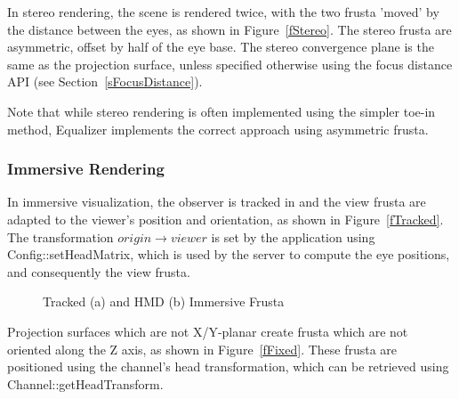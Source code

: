 \documentclass[10pt,a4]{scrartcl}
\newcommand{\fig}[1]{Figure~\ref{#1}}
\newcommand{\sref}[1]{Section~\ref{#1}}
\begin{document}
In stereo rendering, the scene is rendered twice, with the two frusta
'moved' by the distance between the eyes, as shown in \fig{fStereo}. The stereo
frusta are asymmetric, offset by half of the eye base. The stereo convergence
plane is the same as the projection surface, unless specified otherwise using
the focus distance API (see \sref{sFocusDistance}).

Note that while stereo rendering is often implemented using the simpler toe-in
method, Equalizer implements the correct approach using asymmetric frusta.

\subsubsection{Immersive Rendering}

In immersive visualization, the observer is tracked in and the view
frusta are adapted to the viewer's position and orientation, as shown
in \fig{fTracked}. The transformation $origin \rightarrow viewer$ is set by
the application using \textsf{Config::setHead\-Matrix}, which is used by
the server to compute the eye positions, and consequently the view frusta.

\begin{figure}[h!t]\center
  \hfil
  {\caption{\label{fImmersive}Tracked (a) and HMD (b) Immersive Frusta}}
\end{figure}

Projection surfaces which are not X/Y-planar create frusta which are not
oriented along the Z axis, as shown in \fig{fFixed}. These frusta are positioned
using the channel's head transformation, which can be retrieved using
\textsf{Channel::getHeadTransform}.
\end{document}

